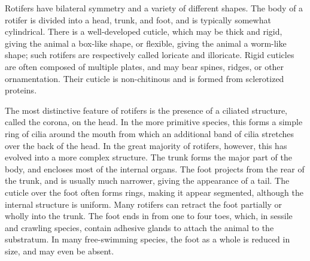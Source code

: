 \documentclass[]{book}
\theoremstyle{definition}
\theoremstyle{definition}
\theoremstyle{definition}
\theoremstyle{remark}
\begin{document}
Rotifers have bilateral symmetry and a variety of different shapes. The
body of a rotifer is divided into a head, trunk, and foot, and is
typically somewhat cylindrical. There is a well-developed cuticle, which
may be thick and rigid, giving the animal a box-like shape, or flexible,
giving the animal a worm-like shape; such rotifers are respectively
called loricate and illoricate. Rigid cuticles are often composed of
multiple plates, and may bear spines, ridges, or other ornamentation.
Their cuticle is non-chitinous and is formed from sclerotized proteins.

The most distinctive feature of rotifers is the presence of a ciliated
structure, called the corona, on the head. In the more primitive
species, this forms a simple ring of cilia around the mouth from which
an additional band of cilia stretches over the back of the head. In the
great majority of rotifers, however, this has evolved into a more
complex structure. The trunk forms the major part of the body, and
encloses most of the internal organs. The foot projects from the rear of
the trunk, and is usually much narrower, giving the appearance of a
tail. The cuticle over the foot often forms rings, making it appear
segmented, although the internal structure is uniform. Many rotifers can
retract the foot partially or wholly into the trunk. The foot ends in
from one to four toes, which, in sessile and crawling species, contain
adhesive glands to attach the animal to the substratum. In many
free-swimming species, the foot as a whole is reduced in size, and may
even be absent.
\end{document}
